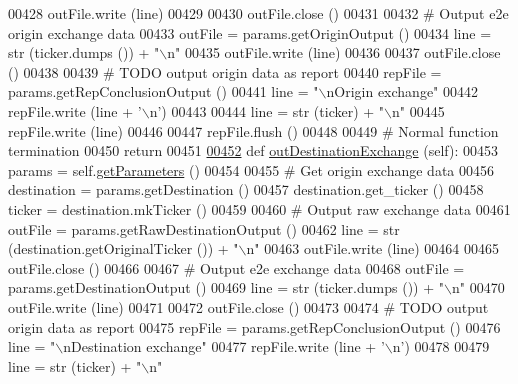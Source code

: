 \begin{DoxyCode}
{00428         outFile.write (line)
00429         
00430         outFile.close ()
00431     
00432         \textcolor{comment}{# Output e2e origin exchange data}
00433         outFile = params.getOriginOutput ()
00434         line = str (ticker.dumps ()) + \textcolor{stringliteral}{"\(\backslash\)n"}
00435         outFile.write (line)
00436         
00437         outFile.close ()
00438         
00439         \textcolor{comment}{# TODO output origin data as report}
00440         repFile = params.getRepConclusionOutput ()
00441         line = \textcolor{stringliteral}{"\(\backslash\)nOrigin exchange"}
00442         repFile.write (line + \textcolor{stringliteral}{'\(\backslash\)n'})
00443         
00444         line = str (ticker) + \textcolor{stringliteral}{"\(\backslash\)n"}
00445         repFile.write (line)
00446         
00447         repFile.flush ()
00448     
00449         \textcolor{comment}{# Normal function termination }
00450         \textcolor{keywordflow}{return} 
00451     
\hyperlink{classe2e_1_1_application_a1b099bee6f8170c4c52e7ae884d95b27}{00452}     \textcolor{keyword}{def }\hyperlink{classe2e_1_1_application_a1b099bee6f8170c4c52e7ae884d95b27}{outDestinationExchange} (self):
00453         params = self.\hyperlink{classe2e_1_1_application_ae7bc7b58f19d681635cfa8ae06d9769b}{getParameters} ()
00454         
00455         \textcolor{comment}{# Get origin exchange data}
00456         destination = params.getDestination ()
00457         destination.get\_ticker ()
00458         ticker = destination.mkTicker ()
00459 
00460         \textcolor{comment}{# Output raw exchange data}
00461         outFile = params.getRawDestinationOutput ()
00462         line = str (destination.getOriginalTicker ()) + \textcolor{stringliteral}{"\(\backslash\)n"}
00463         outFile.write (line)
00464         
00465         outFile.close ()
00466     
00467         \textcolor{comment}{# Output e2e exchange data}
00468         outFile = params.getDestinationOutput ()
00469         line = str (ticker.dumps ()) + \textcolor{stringliteral}{"\(\backslash\)n"}
00470         outFile.write (line)
00471         
00472         outFile.close ()
00473         
00474         \textcolor{comment}{# TODO output origin data as report}
00475         repFile = params.getRepConclusionOutput ()
00476         line = \textcolor{stringliteral}{"\(\backslash\)nDestination exchange"}
00477         repFile.write (line + \textcolor{stringliteral}{'\(\backslash\)n'})
00478         
00479         line = str (ticker) + \textcolor{stringliteral}{"\(\backslash\)n"}
}
\end{DoxyCode}
